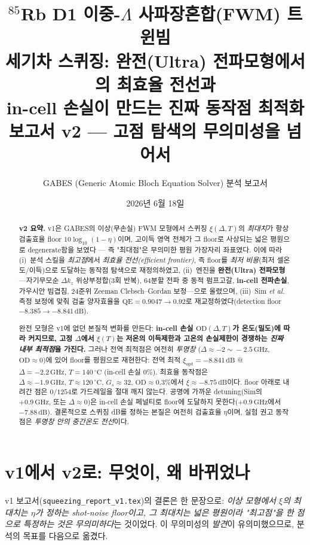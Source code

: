 \documentclass[11pt,a4paper]{article}
\title{\textbf{$^{85}$Rb D1 이중-$\Lambda$ 사파장혼합(FWM) 트윈빔\\
세기차 스퀴징: 완전(Ultra) 전파모형에서의 최효율 전선과\\
in-cell 손실이 만드는 진짜 동작점 최적화}\\[4pt]
\large 보고서 v2 --- 고점 탐색의 무의미성을 넘어서}
\author{GABES (Generic Atomic Bloch Equation Solver) 분석 보고서}
\date{2026년 6월 18일}
\newcommand{\dB}{\,\mathrm{dB}}
\newcommand{\GHz}{\,\mathrm{GHz}}
\newcommand{\degC}{\,^{\circ}\mathrm{C}}
\begin{document}
\maketitle

\begin{abstract}
\noindent
\textbf{v2 요약.} v1은 GABES의 이상(무손실) FWM 모형에서 스퀴징 $\xi(\Delta,T)$의
\emph{최대치}가 항상 검출효율 floor $10\log_{10}(1-\eta)$이며, 고이득 영역 전체가 그 floor로
사상되는 넓은 평원으로 degenerate함을 보였다 --- 즉 "최대점"은 무의미한 평원 가장자리
좌표였다. 이에 따라 (i)~분석 스킬을 \emph{최고점}에서 \emph{최효율 전선(efficient frontier)},
즉 floor를 \emph{최저 비용}(최저 셀온도/이득)으로 도달하는 동작점 탐색으로 재정의하였고,
(ii)~엔진을 \textbf{완전(Ultra) 전파모형}---자기무모순 $\Delta k_z$ 위상부정합(3회 반복),
64분할 전파 중 동적 펌프고갈, \textbf{in-cell 전파손실}, 가우시안 빔겹침, 24준위 Zeeman
Clebsch--Gordan 보정---으로 올렸으며, (iii)~Sim \textit{et al.} 측정 보정에 맞춰 검출 양자효율을
$\mathrm{QE}=0.9047\to 0.92$로 재교정하였다(detection floor $-8.385\to -8.841\dB$).

완전 모형은 v1에 없던 본질적 변화를 만든다: \textbf{in-cell 손실 $\mathrm{OD}(\Delta,T)$가
온도(밀도)에 따라 커지므로, 고정 $\Delta$에서 $\xi(T)$는 저온의 이득제한과 고온의 손실제한이
경쟁하는 \emph{진짜 내부 최적점}을 가진다.} 그러나 전역 최적점은 여전히 \emph{투명창}
($\Delta\approx-2\!\sim\!-2.5\GHz$, $\mathrm{OD}\approx0$)에 있어 floor를 평원으로 재현한다:
전역 최적 $\xi_{\mathrm{opt}}=-8.841\dB$ @ $\Delta=-2.2\GHz,\,T=140\degC$ (in-cell 손실
$0\%$). 최효율 동작점은 $\Delta\approx-1.9\GHz,\,T\approx120\degC,\,G_s\approx32,\,
\mathrm{OD}\approx0.3\%$에서 $\xi\approx-8.75\dB$이다. floor 아래로 내려간 점은 $0/1254$로
가드레일을 절대 깨지 않는다. 공명에 가까운 detuning(Sim의 $+0.9\GHz$, 또는 $\Delta\approx0$)은
in-cell 손실 페널티로 floor에 도달하지 못한다($+0.9\GHz$에서 $-7.88\dB$). 결론적으로
스퀴징 dB를 정하는 본질은 여전히 검출효율 $\eta$이며, 실험 권고 동작점은 \emph{투명창 안의
중간온도 전선}이다.
\end{abstract}

\tableofcontents
\bigskip

\section{v1에서 v2로: 무엇이, 왜 바뀌었나}
v1 보고서(\texttt{squeezing\_report\_v1.tex})의 결론은 한 문장으로: \emph{이상 모형에서
$\xi$의 최대치는 $\eta$가 정하는 shot-noise floor이고, 그 최대치는 넓은 평원이라 "최고점"을
한 점으로 특정하는 것은 무의미하다}는 것이었다. 이 무의미성의 \emph{발견}이 유의미했으므로,
분석의 목표를 다음으로 옮겼다.
\end{document}
